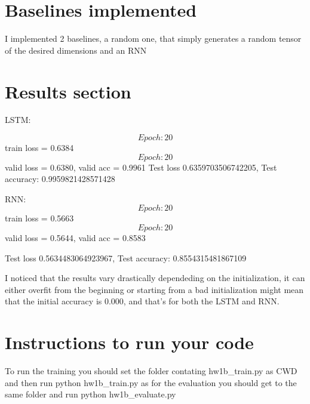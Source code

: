 \documentclass[11pt]{article}
\begin{document}
\section{Baselines implemented}
I implemented 2 baselines, a random one, that simply generates a random tensor of the desired dimensions and an RNN 

\section{Results section}

LSTM: 

\[Epoch: 20\] train loss = 0.6384
\[Epoch: 20\] valid loss = 0.6380, valid acc = 0.9961
Test loss 0.6359703506742205, Test accuracy: 0.9959821428571428

RNN:
\[Epoch: 20\] train loss = 0.5663
\[Epoch: 20\] valid loss = 0.5644, valid acc = 0.8583

Test loss 0.5634483064923967, Test accuracy: 0.8554315481867109

I noticed that the results vary drastically dependeding on the initialization, it can either overfit from the beginning or starting from a bad initialization 
might mean that the initial accuracy is 0.000, and that's for both the LSTM and RNN.

\section{Instructions to run your code}
To run the training you should set the folder contating
hw1b\_train.py as CWD and then run
python hw1b\_train.py
as for the evaluation you should get to the same folder and run
python hw1b\_evaluate.py
\end{document}
